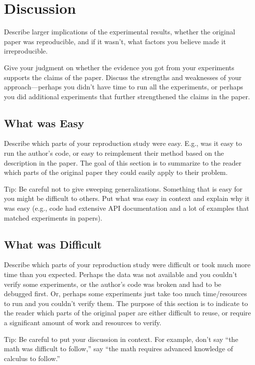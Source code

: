 \documentclass{article}
\begin{document}
\section{Discussion}

Describe larger implications of the experimental results, whether the original paper was reproducible, and if it wasn’t, what factors you believe made it irreproducible. 

Give your judgment on whether  the evidence you got from your experiments supports the claims of the paper. Discuss the strengths and weaknesses of your approach---perhaps you didn't have time to run all the experiments, or perhaps you did additional experiments that further strengthened the claims in the paper.

\subsection{What was Easy}
Describe which parts of your reproduction study were easy. E.g., was it easy to run the author's code, or easy to reimplement their method based on the description in the paper. The goal of this section is to summarize to the reader which parts of the original paper they could easily apply to their problem. 

Tip: Be careful not to give sweeping generalizations. Something that is easy for you might be difficult to others. Put what was easy in context and explain why it was easy (e.g., code had extensive API documentation and a lot of examples that matched experiments in papers). 

\subsection{What was Difficult}
Describe which parts of your reproduction study were difficult or took much more time than you expected. Perhaps the data was not available and you couldn't verify some experiments, or the author's code was broken and had to be debugged first. Or, perhaps some experiments just take too much time/resources to run and you couldn't verify them. The purpose of this section is to indicate to the reader which parts of the original paper are either difficult to reuse, or require a significant amount of work and resources to verify. 

Tip: Be careful to put your discussion in context. For example, don't say ``the math was difficult to follow,'' say ``the math requires advanced knowledge of calculus to follow.'' 
\end{document}
